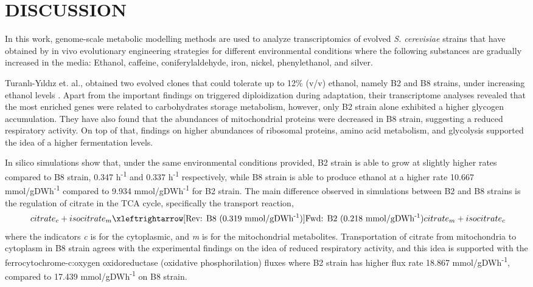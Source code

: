 \chapter{DISCUSSION}

In this work, genome-scale metabolic modelling methods are used to analyze transcriptomics of evolved \emph{S. cerevisiae} strains that have obtained by in vivo evolutionary engineering strategies for different environmental conditions where the following substances are gradually increased in the media: Ethanol, caffeine, coniferylaldehyde, iron, nickel, phenylethanol, and silver.

Turanlı-Yıldız et. al., obtained two evolved clones that could tolerate up to 12\% (v/v) ethanol, namely B2 and B8 strains, under increasing ethanol levels \cite{TuranlYldz2017}. Apart from the important findings on triggered diploidization during adaptation, their transcriptome analyses revealed that the most enriched genes were related to carbohydrates storage metabolism, however, only B2 strain alone exhibited a higher glycogen accumulation. They have also found that the abundances of mitochondrial proteins were decreased in B8 strain, suggesting a reduced respiratory activity. On top of that, findings on higher abundances of ribosomal proteins, amino acid metabolism, and glycolysis supported the idea of a higher fermentation levels.

In silico simulations show that, under the same environmental conditions provided, B2 strain is able to grow at slightly higher rates compared to B8 strain, 0.347 h\textsuperscript{-1} and 0.337 h\textsuperscript{-1} respectively, while B8 strain is able to produce ethanol at a higher rate 10.667 mmol/gDWh\textsuperscript{-1} compared to 9.934 mmol/gDWh\textsuperscript{-1} for B2 strain. The main difference observed in simulations between B2 and B8 strains is the regulation of citrate in the TCA cycle, specifically the transport reaction,
\begin{align}
\label{eq:citratetransport}
\ citrate_c + isocitrate_m \xleftrightarrow[\text{Rev: B8 (0.319 mmol/gDWh\textsuperscript{-1})}]{\text{Fwd: B2 (0.218 mmol/gDWh\textsuperscript{-1})}} citrate_m + isocitrate_c
\end{align}
\noindent where the indicators \emph{c} is for the cytoplasmic, and \emph{m} is for the mitochondrial metabolites. Transportation of citrate from mitochondria to cytoplasm in B8 strain agrees with the experimental findings on the idea of reduced respiratory activity, and this idea is supported with the ferrocytochrome-c:oxygen oxidoreductase (oxidative phosphorilation) fluxes where B2 strain has higher flux rate 18.867 mmol/gDWh\textsuperscript{-1}, compared to 17.439 mmol/gDWh\textsuperscript{-1} on B8 strain.

